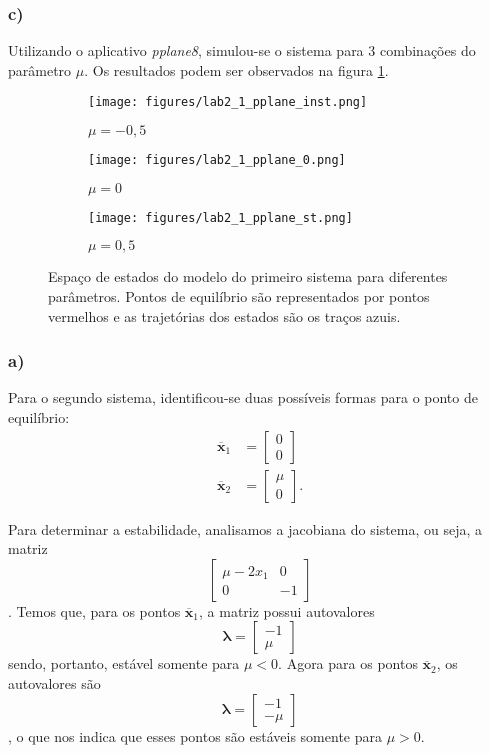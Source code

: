 \documentclass[a4paper]{report}
\begin{document}
\subsubsection*{c)}

Utilizando o aplicativo \emph{pplane8}, simulou-se o sistema para 3 combinações do parâmetro $\mu$. Os resultados podem ser observados na figura \ref{fig:pplane-1}.

\begin{figure}[H]
    \centering
    \begin{subfigure}{0.29\textwidth}
	\texttt{[image: figures/lab2\_1\_pplane\_inst.png]}
	\caption{$\mu=-0,5$}
    \end{subfigure}
    \begin{subfigure}{0.29\textwidth}
	\texttt{[image: figures/lab2\_1\_pplane\_0.png]}
	\caption{$\mu=0$}
    \end{subfigure}
    \begin{subfigure}{0.29\textwidth}
	\texttt{[image: figures/lab2\_1\_pplane\_st.png]}
	\caption{$\mu=0,5$}
    \end{subfigure}
    \caption{Espaço de estados do modelo do primeiro sistema para diferentes parâmetros. Pontos de equilíbrio são representados por pontos vermelhos e as trajetórias dos estados são os traços azuis.}
    \label{fig:pplane-1}
\end{figure}

\exercise{}

\subsubsection*{a)}

Para o segundo sistema, identificou-se duas possíveis formas para o ponto de equilíbrio:
\begin{align*}
    \bm{\overline{x}}_1 &= \begin{bmatrix} 0 \\ 0 \end{bmatrix} \\
    \bm{\overline{x}}_2 &= \begin{bmatrix} \mu \\ 0 \end{bmatrix} 
.\end{align*}

Para determinar a estabilidade, analisamos a jacobiana do sistema, ou seja, a matriz \[
    \begin{bmatrix} \mu-2x_1 & 0 \\ 0 & -1 \end{bmatrix} 
\]. Temos que, para os pontos $\bm{\overline{x}}_1$, a matriz possui autovalores \[
\bm{\lambda} = \begin{bmatrix}   -1 \\ \mu \end{bmatrix}
\] sendo, portanto, estável somente para $\mu<0$. Agora para os pontos $\bm{\overline{x}}_2$, os autovalores são \[
\bm{\lambda} = \begin{bmatrix}   -1 \\ -\mu \end{bmatrix}
\], o que nos indica que esses pontos são estáveis somente para $\mu>0$.
\end{document}
